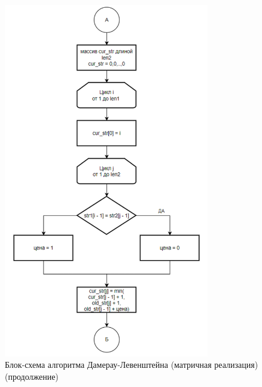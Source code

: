 \begin{figure}[H]
    \centering
    \includegraphics[width=0.8\textwidth]{img/block_2_1_2.png}
    \caption{Блок-схема алгоритма Дамерау-Левенштейна (матричная реализация)\\ (продолжение)}
\end{figure}

